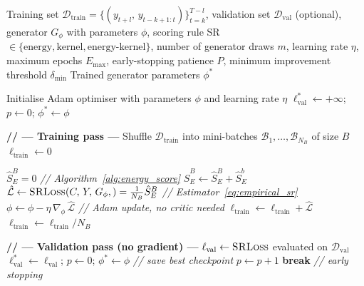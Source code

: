 \begin{algorithm}[H]
\caption{\textsc{SRForGAN} Training via Energy Score Minimisation}
\label{alg:srforgan_train}
\begin{algorithmic}[1]
\REQUIRE
    Training set $\mathcal{D}_{\text{train}} = \{(y_{t+l},\, y_{t-k+1:t})\}_{t=k}^{T-l}$,
    validation set $\mathcal{D}_{\text{val}}$ (optional),
    generator $G_{\phi}$ with parameters $\phi$,
    scoring rule SR $\in \{\text{energy}, \text{kernel}, \text{energy-kernel}\}$,
    number of generator draws $m$,
    learning rate $\eta$,
    maximum epochs $E_{\max}$,
    early-stopping patience $P$,
    minimum improvement threshold $\delta_{\min}$
\ENSURE Trained generator parameters $\phi^*$

\STATE Initialise Adam optimiser with parameters $\phi$ and learning rate $\eta$
\STATE $\ell^*_{\text{val}} \leftarrow +\infty$;\quad
       $p \leftarrow 0$;\quad
       $\phi^* \leftarrow \phi$


    \STATE \textbf{// --- Training pass ---}
    \STATE Shuffle $\mathcal{D}_{\text{train}}$ into mini-batches
           $\mathcal{B}_1, \ldots, \mathcal{B}_{N_B}$ of size $B$
    \STATE $\ell_{\text{train}} \leftarrow 0$

        \STATE $\hat{S}_E^B = 0$
            \STATE {}
            \hfill\textit{// Algorithm~\ref{alg:energy_score}}
            \STATE $\hat{S}_E^B \leftarrow \hat{S}_E^B + \hat{S}_E^b$
        \ENDFOR
        \STATE $\hat{\mathcal{L}} \leftarrow
               \textsc{SRLoss}(C,\, Y,\, G_{\phi},) = \frac{1}{N_B} \hat{S}_E^B$
               \hfill\textit{// Estimator~\ref{eq:empirical_sr}}
        \STATE $\phi \leftarrow \phi - \eta\,\nabla_{\phi}\,\hat{\mathcal{L}}$
               \hfill\textit{// Adam update, no critic needed}
        \STATE $\ell_{\text{train}} \leftarrow \ell_{\text{train}} + \hat{\mathcal{L}}$
    \ENDFOR
    \STATE $\ell_{\text{train}} \leftarrow \ell_{\text{train}} / N_B$

    \STATE \textbf{// --- Validation pass (no gradient) ---}
        \STATE $\ell_{\text{val}} \leftarrow \textsc{SRLoss}$ evaluated on
               $\mathcal{D}_{\text{val}}$ 
            \STATE $\ell^*_{\text{val}} \leftarrow \ell_{\text{val}}$;\quad
                   $p \leftarrow 0$;\quad
                   $\phi^* \leftarrow \phi$
                   \hfill\textit{// save best checkpoint}
        \ELSE
            \STATE $p \leftarrow p + 1$
                \STATE \textbf{break}
                       \hfill\textit{// early stopping}
            \ENDIF
        \ENDIF
    \ENDIF


\end{algorithmic}
\end{algorithm}
